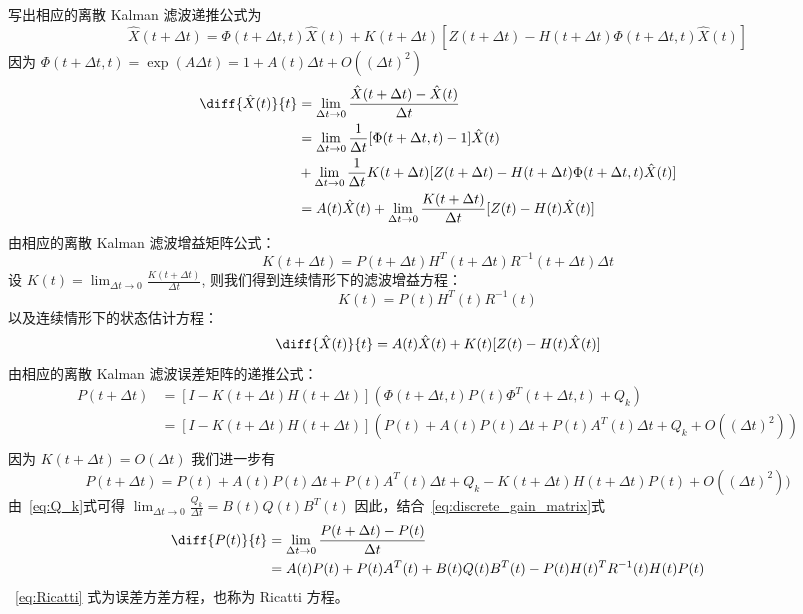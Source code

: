 \documentclass{ctexart}
\begin{document}
写出相应的离散 Kalman 滤波递推公式为
\begin{equation}\label{eq:discrete_update}
\hat{X}( t + \Delta t) = \Phi(t+\Delta t, t) \hat{X}(t) + K(t+\Delta t) [ Z(t+\Delta t) - H(t+ \Delta t) \Phi(t+\Delta t, t) \hat{X}(t)]
\end{equation}
因为 $\Phi(t+\Delta t, t) = \exp(A \Delta t) = 1 + A(t) \Delta t + O( (\Delta t)^2)$
\begin{align*}
\diff{\hat{X}(t)}{t} & = \lim_{\Delta t \to 0} \frac{ \hat{X}(t + \Delta t) - \hat{X}(t) }{\Delta t} \\
& = \lim_{\Delta t \to 0} \frac{1}{\Delta t} [\Phi(t + \Delta t, t) - 1] \hat{X}(t)  \\
& + \lim_{\Delta t \to 0} \frac{1}{\Delta t} K(t+\Delta t) [ Z(t+\Delta t) - H(t + \Delta t) \Phi(t+\Delta t, t) \hat{X}(t)] \\
& = A(t)\hat{X}(t) + \lim_{\Delta t \to 0} \frac{ K(t + \Delta t)}{\Delta t} [ Z(t) - H(t) \hat{X}(t) ]
\end{align*}
由相应的离散 Kalman 滤波增益矩阵公式：
\begin{equation}\label{eq:discrete_gain_matrix}
K( t + \Delta t) = P(t+\Delta t) H^T(t+\Delta t) R^{-1}( t + \Delta t) \Delta t
\end{equation}
设 $ K(t) = \lim_{\Delta t \to 0} \frac{K(t+\Delta t)}{\Delta t} $, 则我们得到连续情形下的滤波增益方程：
\begin{equation}\label{eq:continuous_gain_matrix}
K(t)  = P(t) H^T(t) R^{-1}(t)
\end{equation}
以及连续情形下的状态估计方程：
\begin{equation}\label{eq:continous_state}
\diff{\hat{X}(t)}{t} = A(t) \hat{X}(t) + K(t) [ Z(t) - H(t) \hat{X}(t) ] 
\end{equation}
由相应的离散 Kalman 滤波误差矩阵的递推公式：
\begin{align*}
P(t+\Delta t) & = [I - K(t+\Delta t) H(t+ \Delta t) ] (\Phi(t+\Delta t, t) P(t) \Phi^T(t + \Delta t, t) + Q_k) \\
& = [I - K(t+\Delta t) H(t+ \Delta t) ] (P(t) + A(t)P(t)\Delta t + P(t)A^T(t) \Delta t + Q_k +O( (\Delta t)^2)) \\
\end{align*}
因为 $K(t+\Delta t) = O(\Delta t)$
我们进一步有
$$
P(t+\Delta t) =  P(t) + A(t)P(t)\Delta t + P(t)A^T(t) \Delta t + Q_k - K(t+\Delta t) H(t + \Delta t) P(t) + O( (\Delta t)^2)) 
$$
由~\eqref{eq:Q_k}式可得
$ \lim_{\Delta t \to 0} \frac{Q_k}{\Delta t} = B(t)Q(t)B^T(t) $
因此，结合~\eqref{eq:discrete_gain_matrix}式
\begin{align}
\diff{P(t)}{t} & = \lim_{\Delta t \to 0} \frac{P(t + \Delta t) - P(t)} {\Delta t} \\
\label{eq:Ricatti} & = A(t)P(t) +P(t)A^T(t) + B(t)Q(t)B^T(t) -  P(t)H(t)^T R^{-1}(t) H(t)P(t)
\end{align}
~\eqref{eq:Ricatti} 式为误差方差方程，也称为 Ricatti 方程。
\end{document}
